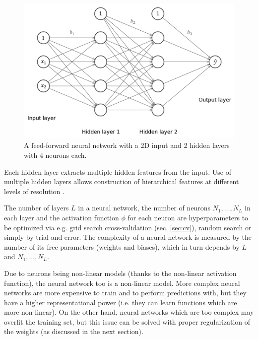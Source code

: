 \begin{figure}[hbt!]
    \centering
    \includegraphics[width=\textwidth]{images/neural_network}
    \caption[A NN with 2 hidden layers]{A feed-forward neural network with a 2D input and 2 hidden layers with 4 neurons each.}
    \label{fig:neural_network}
\end{figure}

Each hidden layer extracts multiple hidden features from the input. Use of multiple hidden layers allows construction of hierarchical features at different levels of resolution \cite{hastie}.

The number of layers $L$ in a neural network, the number of neurons $N_1,\dots,N_L$ in each layer and the activation function $\phi$ for each neuron are hyperparameters to be optimized via e.g. grid search cross-validation (sec. \ref{sec:cv}), random search or simply by trial and error. The complexity of a neural network is measured by the number of its free parameters (weights and biases), which in turn depends by $L$ and $N_1,\dots,N_L$.

Due to neurons being non-linear models (thanks to the non-linear activation function), the neural network too is a non-linear model.
More complex neural networks are more expensive to train and to perform predictions with, but they have a higher representational power (i.e. they can learn functions which are more non-linear). On the other hand, neural networks which are too complex may overfit the training set, but this issue can be solved with proper regularization of the weights (as discussed in the next section).

